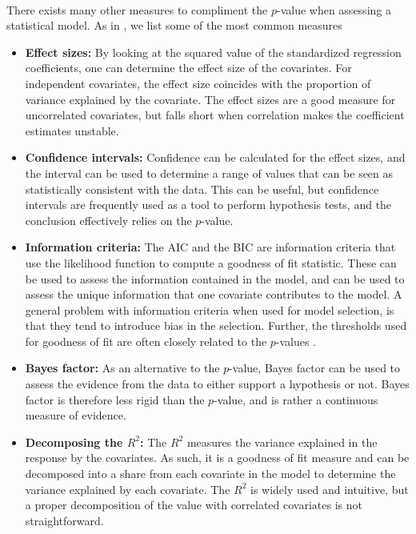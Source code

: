 \\
There exists many other measures to compliment the $p$-value when assessing a statistical model. As in \citet{Arnstad:Relative_variable_importance_in_Bayesian_linear_mixed_models:2024}, we list some of the most common measures
\begin{itemize}
    \item \textbf{Effect sizes:} By looking at the squared value of the standardized regression coefficients, one can determine the effect size of the covariates. For independent covariates, the effect size coincides with the proportion of variance explained by the covariate. The effect sizes are a good measure for uncorrelated covariates, but falls short when correlation makes the coefficient estimates unstable.
    \item \textbf{Confidence intervals:} Confidence can be calculated for the effect sizes, and the interval can be used to determine a range of values that can be seen as statistically consistent with the data. This can be useful, but confidence intervals are frequently used as a tool to perform hypothesis tests, and the conclusion effectively relies on the $p$-value.
    \item \textbf{Information criteria:} The AIC \citep{Akaike_AIC} and the BIC \citep{Schwarz_BIC} are information criteria that use the likelihood function to compute a goodness of fit statistic. These can be used to assess the information contained in the model, and can be used to assess the unique information that one covariate contributes to the model. A general problem with information criteria when used for model selection, is that they tend to introduce bias in the selection. Further, the thresholds used for goodness of fit are often closely related to the $p$-values \citep{Murtaugh2014}. 
    \item \textbf{Bayes factor:} As an alternative to the $p$-value, Bayes factor can be used to assess the evidence from the data to either support a hypothesis or not. Bayes factor is therefore less rigid than the $p$-value, and is rather a continuous measure of evidence.
    \item \textbf{Decomposing the $R^2$:} The $R^2$ measures the variance explained in the response by the covariates. As such, it is a goodness of fit measure and can be decomposed into a share from each covariate in the model to determine the variance explained by each covariate. The $R^2$ is widely used and intuitive, but a proper decomposition of the value with correlated covariates is not straightforward.
\end{itemize}
